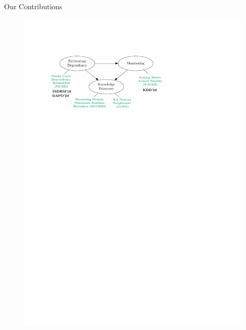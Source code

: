 \documentclass[16pt,usenames,dvipsnames, notheorems]{beamer}
\theoremstyle{definition}
\theoremstyle{example}
\theoremstyle{plain}
\begin{document}
\begin{frame}{Our Contributions}
\begin{figure}
\begin{overprint}
		 \includegraphics[width=1.0 \linewidth]{figures/outline_c_8-compressed.pdf}
	\end{overprint}
\end{figure}
\vspace{-0.7cm}



\end{frame}
\end{document}
